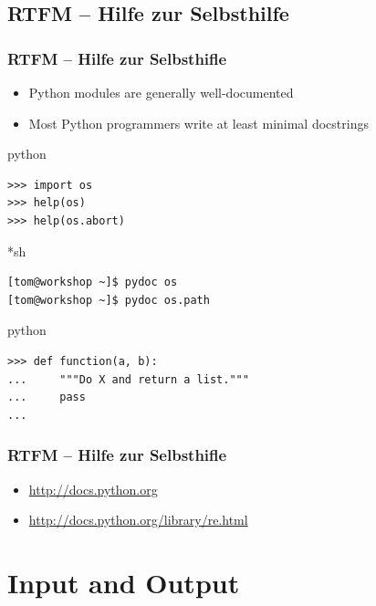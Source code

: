 \documentclass{beamer}
\begin{document}
\subsection{RTFM -- Hilfe zur Selbsthilfe}
\begin{frame}[fragile]
	\frametitle{RTFM -- Hilfe zur Selbsthifle}

	\begin{itemize}
		\item Python modules are generally well-documented
		\item Most Python programmers write at least minimal docstrings
	\end{itemize}

\pause

	\begin{exampleblock}{python}
	\begin{lstlisting}
>>> import os
>>> help(os)
>>> help(os.abort)
	\end{lstlisting}
	\end{exampleblock}

\pause

	\begin{exampleblock}{*sh}
	\begin{lstlisting}[language=bash]
[tom@workshop ~]$ pydoc os
[tom@workshop ~]$ pydoc os.path
	\end{lstlisting}
	\end{exampleblock}

\pause

	\begin{exampleblock}{python}
	\begin{lstlisting}
>>> def function(a, b):
...     """Do X and return a list."""
...     pass
...
	\end{lstlisting}
	\end{exampleblock}
\end{frame}

\begin{frame}[fragile]
	\frametitle{RTFM -- Hilfe zur Selbsthifle}
	
	\begin{itemize}
		\item \url{http://docs.python.org}
		\item \url{http://docs.python.org/library/re.html}
	\end{itemize}

\end{frame}

\section{Input and Output}
\end{document}
